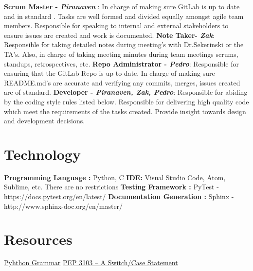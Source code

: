 \documentclass{article}
\begin{document}
\textbf{Scrum Master -\emph{ Piranaven }}: In charge of making sure GitLab is up to date and in standard . Tasks are well formed and divided equally amongst agile team members. Responsible for  speaking to internal and external stakeholders to ensure issues are created and work is documented. \newline
\textbf{Note Taker- \emph{Zak}}:  Responsible for taking detailed notes during meeting's with Dr.Sekerinski or the TA's. Also, in charge of taking meeting minutes during team meetings  scrums, standups, retrospectives, etc. \newline
\textbf{Repo Administrator - \emph{ Pedro}}:  Responsible for ensuring that the GitLab Repo is up to date. In charge of making sure README.md's are accurate and verifying any commits, merges, issues created are of standard.   \newline
\textbf{Developer - \emph{Piranaven, Zak, Pedro}}: Responsible for abiding by the coding style rules listed below. Responsible for delivering high quality code which meet the requirements of the tasks created. Provide insight towards design and development decisions.  \newline




\section{Technology}

\textbf{Programming Language :} Python, C\newline
\textbf{IDE:}  Visual Studio Code, Atom, Sublime, etc. There are no restrictions\newline 
\textbf{Testing Framework :} PyTest  - https://docs.pytest.org/en/latest/\newline
\textbf{Documentation Generation :} Sphinx - http://www.sphinx-doc.org/en/master/\newline 



\section{Resources}
\href{https://docs.python.org/3/reference/grammar.html}{Pyhthon Grammar}\newline
\href{https://www.python.org/dev/peps/pep-3103/}{PEP 3103 -- A Switch/Case Statement}


\newpage
\end{document}
